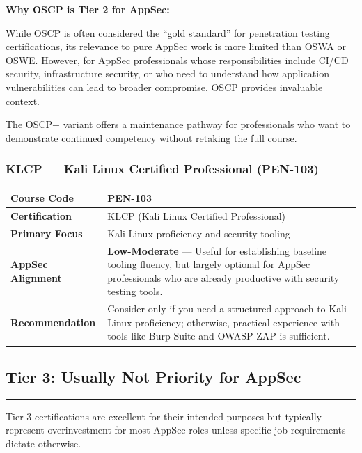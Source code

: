 \documentclass[11pt,letterpaper]{article}
\begin{document}
\textbf{Why OSCP is Tier 2 for AppSec:}

While OSCP is often considered the ``gold standard'' for penetration testing certifications, its relevance to pure AppSec work is more limited than OSWA or OSWE. However, for AppSec professionals whose responsibilities include CI/CD security, infrastructure security, or who need to understand how application vulnerabilities can lead to broader compromise, OSCP provides invaluable context.

The OSCP+ variant offers a maintenance pathway for professionals who want to demonstrate continued competency without retaking the full course.

\subsubsection{KLCP --- Kali Linux Certified Professional (PEN-103)}

\begin{table}[H]
\centering
\begin{tabularx}{\textwidth}{>{\bfseries}l X}
\toprule
Course Code & PEN-103 \\
\midrule
Certification & KLCP (Kali Linux Certified Professional) \\
\midrule
Primary Focus & Kali Linux proficiency and security tooling \\
\midrule
AppSec Alignment & \textbf{Low-Moderate} --- Useful for establishing baseline tooling fluency, but largely optional for AppSec professionals who are already productive with security testing tools. \\
\midrule
Recommendation & Consider only if you need a structured approach to Kali Linux proficiency; otherwise, practical experience with tools like Burp Suite and OWASP ZAP is sufficient. \\
\bottomrule
\end{tabularx}
\end{table}

\subsection{Tier 3: Usually Not Priority for AppSec}

\textcolor{tier3color}{\rule{\linewidth}{2pt}}

Tier 3 certifications are excellent for their intended purposes but typically represent overinvestment for most AppSec roles unless specific job requirements dictate otherwise.
\end{document}

